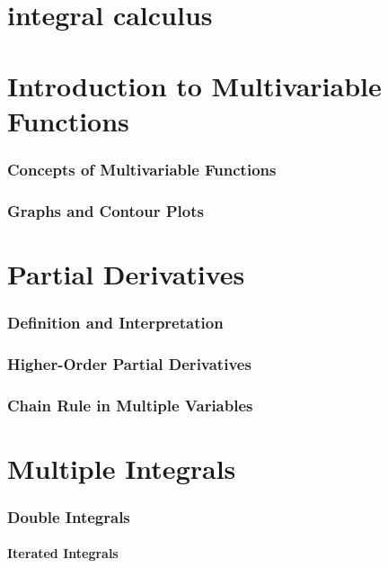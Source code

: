 \chapterspaceabove{6.75cm} 
\chapterspacebelow{7.25cm} 
\chapter{integral calculus}


\chapterspaceabove{6.75cm} 
\chapterspacebelow{7.25cm} 
\chapter{Introduction to Multivariable Functions}
    \subsection{Concepts of Multivariable Functions}
    \subsection{Graphs and Contour Plots}


\chapterspaceabove{6.75cm} 
\chapterspacebelow{7.25cm} 
\chapter{Partial Derivatives}
    \subsection{Definition and Interpretation}
    \subsection{Higher-Order Partial Derivatives}
    \subsection{Chain Rule in Multiple Variables}


\chapterspaceabove{6.75cm} 
\chapterspacebelow{7.25cm}     
\chapter{Multiple Integrals}
    \subsection{Double Integrals}
    \subsubsection{Iterated Integrals}
